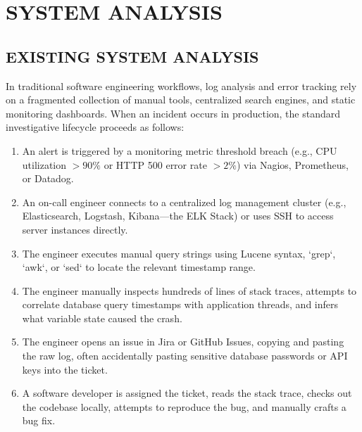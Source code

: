 \documentclass[12pt,a4paper]{article}
\begin{document}
\clearpage
\section{SYSTEM ANALYSIS}\label{sec:system_analysis}

\subsection{EXISTING SYSTEM ANALYSIS}\label{sec:existing_system}
In traditional software engineering workflows, log analysis and error tracking rely on a fragmented collection of manual tools, centralized search engines, and static monitoring dashboards. When an incident occurs in production, the standard investigative lifecycle proceeds as follows:
\begin{enumerate}[leftmargin=1.5em]
    \item An alert is triggered by a monitoring metric threshold breach (e.g., CPU utilization $> 90\%$ or HTTP 500 error rate $> 2\%$) via Nagios, Prometheus, or Datadog.
    \item An on-call engineer connects to a centralized log management cluster (e.g., Elasticsearch, Logstash, Kibana---the ELK Stack) or uses SSH to access server instances directly.
    \item The engineer executes manual query strings using Lucene syntax, `grep`, `awk`, or `sed` to locate the relevant timestamp range.
    \item The engineer manually inspects hundreds of lines of stack traces, attempts to correlate database query timestamps with application threads, and infers what variable state caused the crash.
    \item The engineer opens an issue in Jira or GitHub Issues, copying and pasting the raw log, often accidentally pasting sensitive database passwords or API keys into the ticket.
    \item A software developer is assigned the ticket, reads the stack trace, checks out the codebase locally, attempts to reproduce the bug, and manually crafts a bug fix.
\end{enumerate}
\end{document}
